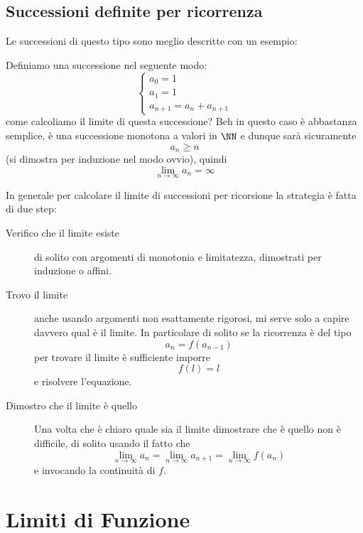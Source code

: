 \documentclass[11pt]{scrartcl}
\begin{document}
	\subsection{Successioni definite per ricorrenza}
	
	Le successioni di questo tipo sono meglio descritte con un esempio:
	\begin{example}[Fibonacci]
		Definiamo una successione nel seguente modo:
		$$
		\begin{cases}
			a_0=1 \\
			a_1=1 \\
			a_{n+1}=a_n+a_{n+1}
		\end{cases}
		$$
		come calcoliamo il limite di questa successione? Beh in questo caso è abbastanza semplice, è una successione monotona a valori in $\NN$ e dunque sarà sicuramente
		$$a_n\ge n$$
		(si dimostra per induzione nel modo ovvio), quindi
		$$\lim_{n\to\infty}a_n=\infty$$
	\end{example}
	In generale per calcolare il limite di successioni per ricorsione la strategia è fatta di due step:
	\begin{description}
		\item[Verifico che il limite esiste] di solito con argomenti di monotonia e limitatezza, dimostrati per induzione o affini.
		\item[Trovo il limite] anche usando argomenti non esattamente rigorosi, mi serve solo a capire davvero qual è il limite. In particolare di solito se la ricorrenza è del tipo $$a_n=f(a_{n-1})$$
		per trovare il limite è sufficiente imporre
		$$f(l)=l$$
		e risolvere l'equazione.
		\item[Dimostro che il limite è quello] Una volta che è chiaro quale sia il limite dimostrare che è quello non è difficile, di solito usando il fatto che 
		$$\lim_{n\to \infty}a_n=\lim_{n\to \infty}a_{n+1}=\lim_{n\to\infty}f(a_n)$$
		e invocando la continuità di $f$.
	\end{description}
	\newpage
	
	
	
	\section{Limiti di Funzione}
	
\end{document}
